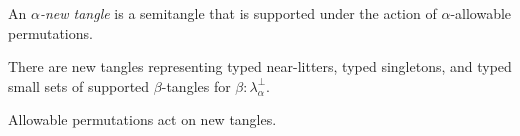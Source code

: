 \documentclass{article}
\begin{document}
\begin{definition}
    An \emph{\( \alpha \)-new tangle} is a semitangle that is supported under the action of \( \alpha \)-allowable permutations.
\end{definition}
\begin{lemma}
    There are new tangles representing typed near-litters, typed singletons, and typed small sets of supported \( \beta \)-tangles for \( \beta : \lambda_\alpha^\bot \).
\end{lemma}
\begin{lemma}
    Allowable permutations act on new tangles.
\end{lemma}
\end{document}
